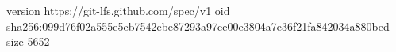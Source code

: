version https://git-lfs.github.com/spec/v1
oid sha256:099d76f02a555e5eb7542ebe87293a97ee00e3804a7e36f21fa842034a880bed
size 5652

